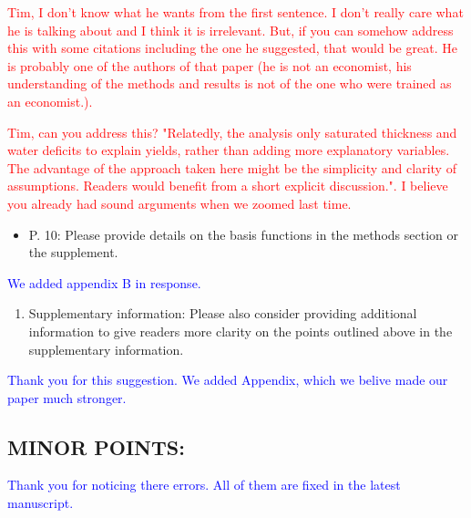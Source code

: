 \documentclass[
]{article}
\providecommand{\tightlist}{%
  \setlength{\itemsep}{0pt}\setlength{\parskip}{0pt}}
\begin{document}
\textcolor{red}{Tim, I don't know what he wants from the first sentence. I don't really care what he is talking about and I think it is irrelevant. But, if you can somehow address this with some citations including the one he suggested, that would be great. He is probably one of the authors of that paper (he is not an economist, his understanding of the methods and results is not of the one who were trained as an economist.).}

\textcolor{red}{Tim, can you address this? "Relatedly, the analysis only saturated thickness and water deficits to explain yields, rather than adding more explanatory variables. The advantage of the approach taken here might be the simplicity and clarity of assumptions. Readers would benefit from a short explicit discussion.". I believe you already had sound arguments when we zoomed last time.}

\begin{itemize}
\tightlist
\item
  P. 10: Please provide details on the basis functions in the methods
  section or the supplement.
\end{itemize}

\textcolor{blue}{We added appendix B in response.}

\begin{enumerate}
\def\labelenumi{\arabic{enumi}.}
\setcounter{enumi}{7}
\tightlist
\item
  Supplementary information: Please also consider providing additional
  information to give readers more clarity on the points outlined above
  in the supplementary information.
\end{enumerate}

\textcolor{blue}{Thank you for this suggestion. We added Appendix, which we belive made our paper much stronger.}

\hypertarget{minor-points}{%
\subsection{MINOR POINTS:}\label{minor-points}}

\textcolor{blue}{Thank you for noticing there errors. All of them are fixed in the latest manuscript.}
\end{document}
